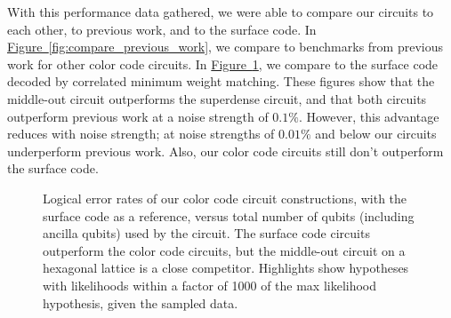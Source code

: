 \documentclass[onecolumn,unpublished,a4paper]{quantumarticle}
\theoremstyle{definition}
\theoremstyle{definition}
\theoremstyle{definition}
\newcommand{\fig}[1]{\hyperref[fig:#1]{Figure~\ref*{fig:#1}}}
\begin{document}
With this performance data gathered, we were able to compare our circuits to each other, to previous work, and to the surface code.
In \fig{compare_previous_work}, we compare to benchmarks from previous work for other color code circuits.
In \fig{compare}, we compare to the surface code decoded by correlated minimum weight matching.
These figures show that the middle-out circuit outperforms the superdense circuit, and that both circuits outperform previous work at a noise strength of $0.1\%$.
However, this advantage reduces with noise strength; at noise strengths of $0.01\%$ and below our circuits underperform previous work.
Also, our color code circuits still don't outperform the surface code.

\begin{figure}
    \centering
    \caption{
        Logical error rates of our color code circuit constructions, with the surface code as a reference, versus total number of qubits (including ancilla qubits) used by the circuit.
        The surface code circuits outperform the color code circuits, but the middle-out circuit on a hexagonal lattice is a close competitor.
        Highlights show hypotheses with likelihoods within a factor of 1000 of the max likelihood hypothesis, given the sampled data.
    }
    \label{fig:compare}
\end{figure}
\end{document}
